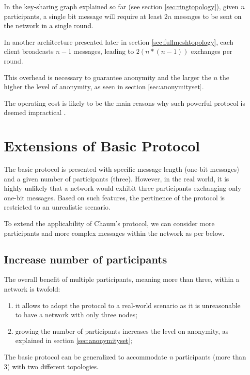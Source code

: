 In the key-sharing graph explained so far (see section \ref{sec:ringtopology}), given $n$ participants, a single bit message will require at least $2n$ messages to be sent on the network in a single round. 

In another architecture presented later in section \ref{sec:fullmeshtopology}, each client broadcasts $n-1$ messages, leading to $2(n * (n - 1))$ exchanges per round.

This overhead is necessary to guarantee anonymity and the larger the $n$ the higher the level of anonymity, as seen in section \ref{sec:anonymityset}. 

The operating cost is likely to be the main reasons why such powerful protocol is deemed impractical \cite{Scholz}.


\section{Extensions of Basic Protocol}

The basic protocol is presented with specific message length (one-bit messages) and a given number of participants (three). However, in the real world, it is highly unlikely that a network would exhibit three participants exchanging only one-bit messages. Based on such features, the pertinence of the protocol is restricted to an unrealistic scenario. 

To extend the applicability of Chaum's protocol, we can consider more participants and more complex messages within the network as per below.

\subsection{Increase number of participants} \label{sec:participantsextention}
The overall benefit of multiple participants, meaning more than three, within a network is twofold:
\begin{enumerate}
    \item it allows to adopt the protocol to a real-world scenario as it is unreasonable to have a network with only three nodes;
    \item growing the number of participants increases the level on anonymity, as explained in section \ref{sec:anonymityset};
\end{enumerate} 

The basic protocol can be generalized to accommodate \textit{n} participants (more than 3) with two different topologies.


